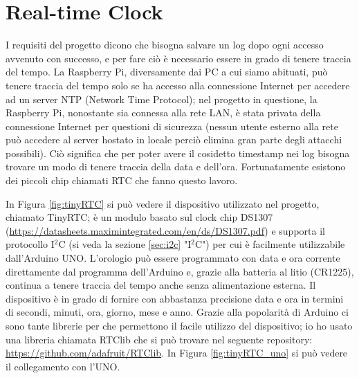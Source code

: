 \documentclass[12pt]{report}
\begin{document}
%
\section{Real-time Clock}
%

I requisiti del progetto dicono che bisogna salvare un log dopo ogni accesso avvenuto con successo, e per fare ciò è necessario essere in grado di tenere traccia del tempo. La Raspberry Pi, diversamente dai PC a cui siamo abituati, può tenere traccia del tempo solo se ha accesso alla connessione Internet per accedere ad un server NTP (Network Time Protocol); nel progetto in questione, la Raspberry Pi, nonostante sia connessa alla rete LAN, è stata privata della connessione Internet per questioni di sicurezza (nessun utente esterno alla rete può accedere al server hostato in locale perciò elimina gran parte degli attacchi possibili). Ciò significa che per poter avere il cosidetto timestamp nei log bisogna trovare un modo di tenere traccia della data e dell'ora. Fortunatamente esistono dei piccoli chip chiamati RTC che fanno questo lavoro. 

In Figura \ref{fig:tinyRTC} si può vedere il dispositivo utilizzato nel progetto, chiamato TinyRTC; è un modulo basato sul clock chip DS1307 (\url{https://datasheets.maximintegrated.com/en/ds/DS1307.pdf}) e supporta il protocollo I$^2$C (si veda la sezione \ref{sec:i2c} "I$^2$C") per cui è facilmente utilizzabile dall'Arduino UNO.
L'orologio può essere programmato con data e ora corrente direttamente dal programma dell'Arduino e, grazie alla batteria al litio (CR1225), continua a tenere traccia del tempo anche senza alimentazione esterna. Il dispositivo è in grado di fornire con abbastanza precisione data e ora in termini di secondi, minuti, ora, giorno, mese e anno. Grazie alla popolarità di Arduino ci sono tante librerie per che permettono il facile utilizzo del dispositivo; io ho usato una libreria chiamata RTClib che si può trovare nel seguente repository: \url{https://github.com/adafruit/RTClib}. In Figura \ref{fig:tinyRTC_uno} si può vedere il collegamento con l'UNO.
\end{document}
